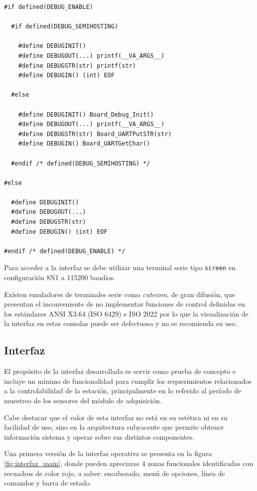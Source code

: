 \begin{lstlisting}[caption={Macros para habilitar/deshabilitar mensajes de depuración del código.},label={lst:debug}]
#if defined(DEBUG_ENABLE)

  #if defined(DEBUG_SEMIHOSTING)
	  
    #define DEBUGINIT()
    #define DEBUGOUT(...) printf(__VA_ARGS__)
    #define DEBUGSTR(str) printf(str)
    #define DEBUGIN() (int) EOF

  #else
  
    #define DEBUGINIT() Board_Debug_Init()
    #define DEBUGOUT(...) printf(__VA_ARGS__)
    #define DEBUGSTR(str) Board_UARTPutSTR(str)
    #define DEBUGIN() Board_UARTGetChar()
  
  #endif /* defined(DEBUG_SEMIHOSTING) */

#else
  
  #define DEBUGINIT()
  #define DEBUGOUT(...)
  #define DEBUGSTR(str)
  #define DEBUGIN() (int) EOF
  
#endif /* defined(DEBUG_ENABLE) */
\end{lstlisting}

Para acceder a la interfaz se debe utilizar una terminal serie tipo \texttt{screen} \citep{screen} en configuración 8N1 a 115200 baudios. 

Existen emuladores de terminales serie como \textit{cutecom}, de gran difusión, que presentan el inconveniente de no implementar funciones de control definidas en los estándares ANSI X3.64 (ISO 6429) e ISO 2022 por lo que la visualización de la interfaz en estas consolas puede ser defectuosa y no se recomienda su uso.


\subsection{Interfaz}
\label{subsec:interfaz}

El propósito de la interfaz desarrollada es servir como prueba de concepto e incluye un mínimo de funcionalidad para cumplir los requerimientos relacionados a la controlabilidad de la estación, principalmente en lo referido al período de muestreo de los sensores del módulo de adquisición. 

Cabe destacar que el valor de esta interfaz no está en su estética ni en su facilidad de uso, sino en la arquitectura subyacente que permite obtener información sistema y operar sobre sus distintos componentes.

Una primera versión de la interfaz operativa se presenta en la figura \ref{fig:interfaz_main}, donde pueden apreciarse 4 zonas funcionales identificadas con recuadros de color rojo, a saber: encabezado, menú de opciones, línea de comandos y barra de estado. 

